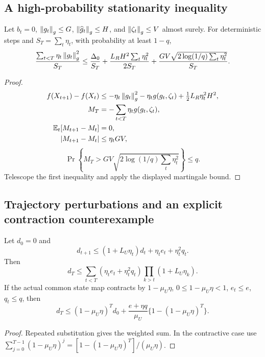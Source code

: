 \subsection{A high-probability stationarity inequality}
\begin{theorem}
Let $b_t=0$, $\left\lVert g_t\right\rVert_g\leq G$, $\left\lVert\widehat g_t\right\rVert_g\leq H$, and
$\left\lVert\zeta_t\right\rVert_g\leq V$ almost surely. For deterministic steps and
$S_T=\sum_t\eta_t$, with probability at least $1-q$,
\begin{equation}
\frac{\sum_{t<T}\eta_t\left\lVert g_t\right\rVert_g^2}{S_T}
\leq\frac{\Delta_0}{S_T}
+\frac{L_RH^2\sum_t\eta_t^2}{2S_T}
+\frac{GV\sqrt{2\log(1/q)\sum_t\eta_t^2}}{S_T}.
\label{eq:rigid-high-prob}
\end{equation}
\end{theorem}
\begin{proof}
\begin{align}
f(X_{t+1})-f(X_t)
&\leq-\eta_t\left\lVert g_t\right\rVert_g^2
-\eta_tg(g_t,\zeta_t)+\tfrac12L_R\eta_t^2H^2,\\
M_T&=-\sum_{t<T}\eta_tg(g_t,\zeta_t),\\
\mathbb E_t[M_{t+1}-M_t]&=0,\\
|M_{t+1}-M_t|&\leq\eta_tGV,\\
\end{align}
\begin{equation}
\Pr\left\{M_T>GV\sqrt{2\log(1/q)\sum_t\eta_t^2}\right\}\leq q .
\end{equation}
Telescope the first inequality and apply the displayed martingale bound.
\end{proof}

\subsection{Trajectory perturbations and an explicit contraction counterexample}
\begin{theorem}
Let $d_0=0$ and
\begin{equation}
d_{t+1}\leq(1+L_U\eta_t)d_t+\eta_te_t+\eta_t^2q_t .
\end{equation}
Then
\begin{equation}
d_T\leq\sum_{t<T}(\eta_te_t+\eta_t^2q_t)
\prod_{k>t}(1+L_U\eta_k).
\end{equation}
If the actual common state map contracts by $1-\mu_U\eta$,
$0\leq1-\mu_U\eta<1$, $e_t\leq e$, $q_t\leq q$, then
\begin{equation}
d_T\leq(1-\mu_U\eta)^T d_0+
\frac{e+\eta q}{\mu_U}\{1-(1-\mu_U\eta)^T\}.
\end{equation}
\end{theorem}
\begin{proof}
Repeated substitution gives the weighted sum. In the contractive case use
$\sum_{j=0}^{T-1}(1-\mu_U\eta)^j
=[1-(1-\mu_U\eta)^T]/(\mu_U\eta)$.
\end{proof}


